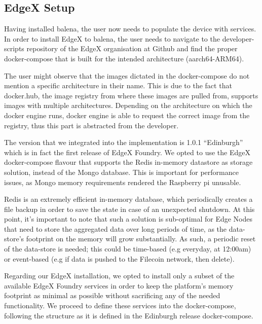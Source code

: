 \subsection{EdgeX Setup}

Having installed balena, the user now needs to populate the device with services. In order to install EdgeX to balena, the user needs to navigate to the developer-scripts repository of the EdgeX organisation at Github\cite{edgex-github} and find the proper docker-compose that is built for the intended architecture (aarch64-ARM64).

The user might observe that the images dictated in the docker-compose do not mention a specific architecture in their name. This is due to the fact that docker.hub, the image registry from where these images are pulled from, supports images with multiple architectures. Depending on the architecture on which the docker engine runs, docker engine is able to request the correct image from the registry, thus this part is abstracted from the developer.

The version that we integrated into the implementation is 1.0.1 “Edinburgh” which is in fact the first release of EdgeX Foundry. We opted to use the EdgeX docker-compose flavour that supports the Redis\cite{redis} in-memory datastore as storage solution, instead of the Mongo database. This is important for performance issues, as Mongo\cite{mongo} memory requirements rendered the Raspberry pi unusable.

Redis is an extremely efficient in-memory database, which periodically creates a file backup in order to save the state in case of an unexpected shutdown. At this point, it’s important to note that such a solution is sub-optimal for Edge Nodes that need to store the aggregated data over long periods of time, as the data-store’s footprint on the memory will grow substantially. As such, a periodic reset of the data-store is needed; this could be time-based (e.g everyday, at 12:00am) or event-based (e.g if data is pushed to the Filecoin network, then delete).

Regarding our EdgeX installation, we opted to install only a subset of the available EdgeX Foundry services in order to keep the platform’s memory footprint as minimal as possible without sacrificing any of the needed functionality. We proceed to define these services into the docker-compose, following the structure as it is defined in the Edinburgh release docker-compose.


